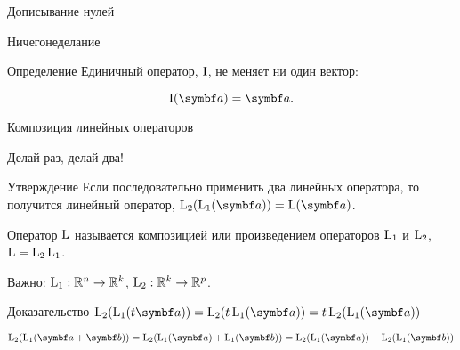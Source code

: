 \begin{frame}{Дописывание нулей}
\begin{minipage}{0.60\linewidth}

\end{minipage}


\end{frame}


\begin{frame}{Ничегонеделание}

	\begin{block}{Определение}
	\alert{Единичный} оператор, $\mathrm{I}$, не меняет ни один вектор:

    \[
		\Id(\ba) = \ba.
	\]
	\end{block}


\end{frame}






\begin{frame}{Композиция линейных операторов}

\alert{Делай раз, делай два!}
\pause
\begin{block}{Утверждение}
Если последовательно применить два линейных оператора, 
    то получится линейный оператор, $\LL_2 (\LL_1 (\ba)) = \LL(\ba)$.
\end{block}

Оператор $\operatorname{L}$ называется \alert{композицией} или \alert{произведением} операторов $\operatorname{L}_1$ и $\operatorname{L}_2$, $\operatorname{L} = \operatorname{L}_2 \operatorname{L}_1$.

\pause
Важно: $\operatorname{L}_1 : \mathbb{R}^n \to \mathbb{R}^k$, $\operatorname{L}_2 : \mathbb{R}^k \to \mathbb{R}^p$.
\pause
\begin{block}{Доказательство}
$
\LL_2 (\LL_1 (t \ba)) = \LL_2 (t \LL_1 (\ba)) = t \LL_2(\LL_1(\ba))
$ \pause

$
\LL_2 (\LL_1 (\ba + \bb)) = \LL_2 (\LL_1 (\ba) + \LL_1(\bb)) = \LL_2(\LL_1(\ba)) + \LL_2(\LL_1(\bb))
$
\end{block}



\end{frame}


